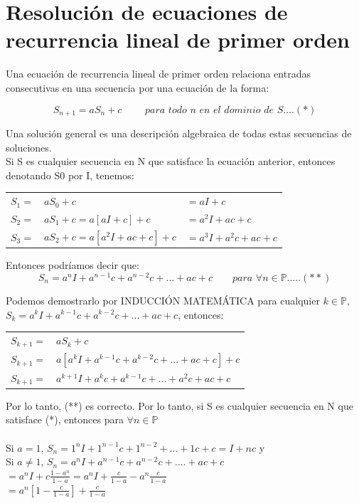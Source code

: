 \documentclass{article}
\begin{document}
\section{Resolución de ecuaciones de recurrencia lineal de primer orden}

Una ecuación de recurrencia lineal de primer orden relaciona entradas consecutivas en una secuencia por una ecuación de la forma:

 $$S_{n+1}=a S_{n}+c \qquad\textit{ para todo n en el dominio de S}....(*)$$

Una solución general es una descripción algebraica de todas estas secuencias de soluciones.\\
Si S es cualquier secuencia en N que satisface la ecuación anterior, entonces denotando S0 por I, tenemos:\\

\begin{tabular}{lll}
    $S_1 =$ & $aS_0 + c$  & $=aI+c$ \\
    $S_2 =$ & $aS_1 + c = a[aI + c]+c$  & $=a^2I+ac+c$ \\
    $S_3 =$ & $aS_2 +c = a[a^2 I +ac + c] + c$ & $=a^3I+a^2c+ac+c$
\end{tabular}

Entonces podríamos decir que:
$$S_n = a^nI + a^{n-1}c + a^{n-2}c + ... + ac + c \qquad \textit{para $\forall n \in \mathbb{P}$}.....(**)$$

Podemos demostrarlo por INDUCCIÓN MATEMÁTICA para cualquier $k \in \mathbb{P}$, $S_k = a^kI + a^{k-1}c + a^{k-2}c + ... + ac + c$, entonces:\\

\begin{tabular}{cl}
    $S_{k+1}=$  & $aS_{k} + c$  \\
    $S_{k+1}=$  & $a[a^kI+a^{k-1}c+a^{k-2}c + ... + ac +c] + c$\\
    $S_{k+1}=$ & $a^{k+1}I + a^k c+a^{k-1}c + ... + a^2c+ ac + c$
\end{tabular}

Por lo tanto, (**)  es correcto. Por lo tanto, si S es cualquier secuencia en N que satisface (*), entonces para $\forall n \in \mathbb{P}$\\\\

Si $a =1$, $S_n = 1^n I + 1^{n-1}c + 1^{n-2}+...+1c+c = I + nc$ y \\
Si $a \neq 1$, $S_n = a^n I+a^{n-1}c + a^{n-2}c + .... + ac +c$\\
$= a^nI + c \frac{1-a^n}{1-a} = a^n I + \frac{c}{1-a} - a^n\frac{c}{1-a}$\\
$=a^n[1-\frac{c}{1-a}] + \frac{c}{1-a}$\\\\
\end{document}

